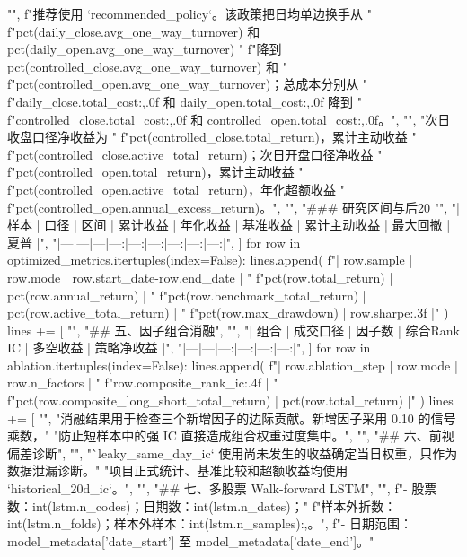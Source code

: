 \documentclass[UTF8,a4paper,fontset=fandol]{ctexart}
\begin{document}
\begin{ProjectCode}
{        "",
        f"推荐使用 `{recommended_policy}`。该政策把日均单边换手从 "
        f"{pct(daily_close.avg_one_way_turnover)} 和 {pct(daily_open.avg_one_way_turnover)} "
        f"降到 {pct(controlled_close.avg_one_way_turnover)} 和 "
        f"{pct(controlled_open.avg_one_way_turnover)}；总成本分别从 "
        f"{daily_close.total_cost:,.0f} 和 {daily_open.total_cost:,.0f} 降到 "
        f"{controlled_close.total_cost:,.0f} 和 {controlled_open.total_cost:,.0f}。",
        "",
        "次日收盘口径净收益为 "
        f"{pct(controlled_close.total_return)}，累计主动收益 "
        f"{pct(controlled_close.active_total_return)}；次日开盘口径净收益 "
        f"{pct(controlled_open.total_return)}，累计主动收益 "
        f"{pct(controlled_open.active_total_return)}，年化超额收益 "
        f"{pct(controlled_open.annual_excess_return)}。",
        "",
        "### 研究区间与后20%
        "",
        "| 样本 | 口径 | 区间 | 累计收益 | 年化收益 | 基准收益 | 累计主动收益 | 最大回撤 | 夏普 |",
        "|---|---|---|---:|---:|---:|---:|---:|---:|",
    ]
    for row in optimized_metrics.itertuples(index=False):
        lines.append(
            f"| {row.sample} | {row.mode} | {row.start_date}-{row.end_date} | "
            f"{pct(row.total_return)} | {pct(row.annual_return)} | "
            f"{pct(row.benchmark_total_return)} | {pct(row.active_total_return)} | "
            f"{pct(row.max_drawdown)} | {row.sharpe:.3f} |"
        )
    lines += [
        "",
        "## 五、因子组合消融",
        "",
        "| 组合 | 成交口径 | 因子数 | 综合Rank IC | 多空收益 | 策略净收益 |",
        "|---|---|---:|---:|---:|---:|",
    ]
    for row in ablation.itertuples(index=False):
        lines.append(
            f"| {row.ablation_step} | {row.mode} | {row.n_factors} | "
            f"{row.composite_rank_ic:.4f} | "
            f"{pct(row.composite_long_short_total_return)} | {pct(row.total_return)} |"
        )
    lines += [
        "",
        "消融结果用于检查三个新增因子的边际贡献。新增因子采用 0.10 的信号乘数，"
        "防止短样本中的强 IC 直接造成组合权重过度集中。",
        "",
        "## 六、前视偏差诊断",
        "",
        "`leaky_same_day_ic` 使用尚未发生的收益确定当日权重，只作为数据泄漏诊断。"
        "项目正式统计、基准比较和超额收益均使用 `historical_20d_ic`。",
        "",
        "## 七、多股票 Walk-forward LSTM",
        "",
        f"- 股票数：{int(lstm.n_codes)}；日期数：{int(lstm.n_dates)}；"
        f"样本外折数：{int(lstm.n_folds)}；样本外样本：{int(lstm.n_samples):,}。",
        f"- 日期范围：{model_metadata['date_start']} 至 {model_metadata['date_end']}。"
}
\end{ProjectCode}
\end{document}
